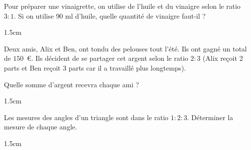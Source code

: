 \documentclass[a4paper]{book}
\begin{document}
        
    \begin{exercice}
        Pour préparer une vinaigrette, on utilise de l'huile et du vinaigre selon le ratio $3:1$.
        Si on utilise $90\text{ ml}$ d'huile, quelle quantité de vinaigre faut-il ?
        \begin{ZoneReponse}{1.5cm}
        \end{ZoneReponse}
    \end{exercice}


    \begin{exercice}
        Deux amis, Alix et Ben, ont tondu des pelouses tout l'été. Ils ont gagné un total de $150$~\euro{}.
        Ils décident de se partager cet argent selon le ratio $2:3$ (Alix reçoit 2 parts et Ben reçoit 3 parts car il a travaillé plus longtemps).
        
        Quelle somme d'argent recevra chaque ami ?
        
        \begin{ZoneReponse}{1.5cm}
        \end{ZoneReponse}
    \end{exercice}
    
        
    \begin{exercice}
        Les mesures des angles d'un triangle sont dans le ratio $1:2:3$. Déterminer la mesure de chaque angle.
        \begin{ZoneReponse}{1.5cm}
        \end{ZoneReponse}
    \end{exercice}
\end{document}
